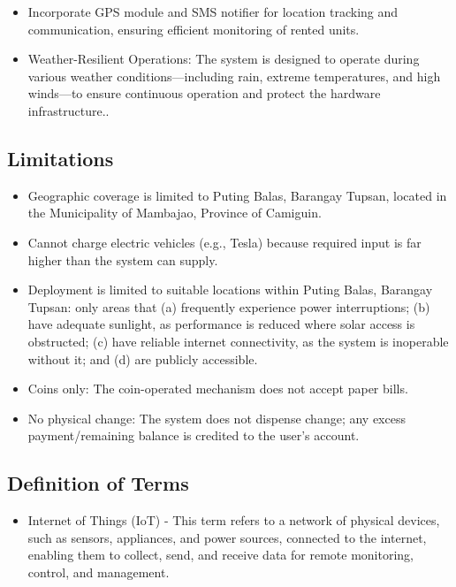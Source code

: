 {\begin{itemize}
		\item Incorporate GPS module and SMS notifier for location tracking and communication, ensuring efficient monitoring of rented units.
		
		\item Weather-Resilient Operations: The system is designed to operate during various weather conditions—including rain, extreme temperatures, and high winds—to ensure continuous operation and protect the hardware infrastructure..
		
\end{itemize}

\subsection{Limitations}
	\begin{itemize}
		\item Geographic coverage is limited to Puting Balas, Barangay Tupsan, located in the Municipality of Mambajao, Province of Camiguin.
		\item Cannot charge electric vehicles (e.g., Tesla) because required input is far higher than the system can supply.
		\item Deployment is limited to suitable locations within Puting Balas, Barangay Tupsan: only areas that (a) frequently experience power interruptions; (b) have adequate sunlight, as performance is reduced where solar access is obstructed; (c) have reliable internet connectivity, as the system is inoperable without it; and (d) are publicly accessible.
		\item Coins only: The coin-operated mechanism does not accept paper bills.
		\item No physical change: The system does not dispense change; any excess payment/remaining balance is credited to the user’s account.
	\end{itemize}

\subsection{Definition of Terms}

\begin{itemize}
	\item Internet of Things (IoT) - This term refers to a network of physical devices, such as sensors, appliances, and power sources, connected to the internet, enabling them to collect, send, and receive data for remote monitoring, control, and management.
	

\end{itemize}}
